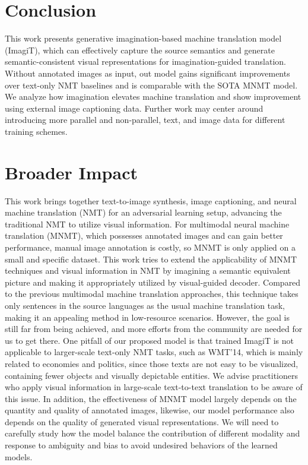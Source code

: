 \documentclass[11pt]{article}
\newcommand{\method}{ImagiT\xspace}
\begin{document}
\section{Conclusion}
\label{sec:conclusion}
This work presents generative imagination-based machine translation model (\method), which can effectively capture the source semantics and generate semantic-consistent visual representations for imagination-guided translation. Without annotated images as input, out model gains significant improvements over text-only NMT baselines and is comparable with the SOTA MNMT model. We analyze how imagination elevates machine translation and show improvement using external image captioning data. Further work may center around introducing more parallel and non-parallel, text, and image data for different training schemes.  
\section{Broader Impact}
\label{sec:broader}
This work brings together text-to-image synthesis, image captioning, and neural machine translation (NMT) for an adversarial learning setup, advancing the traditional NMT to utilize visual information. For multimodal neural machine translation (MNMT), which possesses annotated images and can gain better performance, manual image annotation is costly, so MNMT is only applied on a small and specific dataset. This work tries to extend the applicability of MNMT techniques and visual information in NMT by imagining a semantic equivalent picture and making it appropriately utilized by visual-guided decoder. Compared to the previous multimodal machine translation approaches, this technique takes only sentences in the source languages as the usual machine translation task, making it an appealing method in low-resource scenarios. However, the goal is still far from being achieved, and more efforts from the community are needed for us to get there. One pitfall of our proposed model is that trained \method is not applicable to larger-scale text-only NMT tasks, such as WMT'14, which is mainly related to economies and politics, since those texts are not easy to be visualized, containing fewer objects and visually depictable entities. We advise practitioners who apply visual information in large-scale text-to-text translation to be aware of this issue. In addition, the effectiveness of MNMT model largely depends on the quantity and quality of annotated images, likewise, our model performance also depends on the quality of generated visual representations. We will need to carefully study how the model balance the contribution of different modality and response to ambiguity and bias to avoid undesired behaviors of the learned models. 
\end{document}
